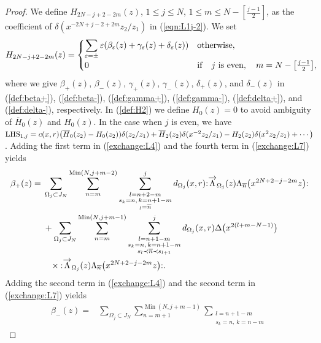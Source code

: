 \documentclass[10pt,a4paper]{amsart}
\numberwithin{equation}{section}
\begin{document}
\begin{proof}
{\sloppy We define ${H}_{2N-j+2-2m}(z)$, $1\leq j \leq N$, $1\leq m \leq N-[\frac{j-1}{2}]$,
as the coefficient of $\delta(x^{-2N+j-2+2m}z_2/z_1)$ in (\ref{eqn:L1j-2}). We set
\begin{gather}
{H}_{2N-j+2-2m}(z)=\begin{cases}
\displaystyle \sum_{\varepsilon=\pm}
\varepsilon ({\beta}_\varepsilon(z)+{\gamma}_\varepsilon(z)+{\delta}_\varepsilon(z))
& {\rm otherwise},
\\
0&{\rm {if}}\quad j~{\rm {is}~even},\quad m=N-\big[\frac{j-1}{2}\big],
\end{cases}\!\!\!\label{def:H2}
\end{gather}}%
where we give
${\beta}_+(z)$, ${\beta}_-(z)$, ${\gamma}_+(z)$,
${\gamma}_-(z)$, ${\delta}_+(z)$, and ${\delta}_-(z)$
in (\ref{def:beta+}), (\ref{def:beta-}), (\ref{def:gamma+}), (\ref{def:gamma-}),
(\ref{def:delta+}), and (\ref{def:delta-}), respectively.
In (\ref{def:H2}) we define $H_0(z)=0$ to avoid ambiguity of
$\overline{H}_0(z)$ and $H_0(z)$. In the case when $j$ is even, we have
${\rm LHS}_{1,j}=c(x,r)\big(\overline{H}_0(z_2)-H_0(z_2))\delta(z_2/z_1)
+\overline{H}_2(z_2)\delta(x^{-2}z_2/z_1)-H_2(z_2)\delta(x^2z_2/z_1)+\cdots\big)$.
Adding the first term in (\ref{exchange:L4}) and the fourth term
in (\ref{exchange:L7}) yields
\begin{align}
\beta_+(z)={}&\sum_{\Omega_j \subset J_N}
\sum_{n=m}^{\operatorname{Min}(N, j+m-2)}
\sum\limits_{\substack{l=n+2-m\\s_k=n,\, k=n+1-m
\\{_l=\overline{n}}}}^{j}d_{\Omega_j}(x,r)
{:}\overrightarrow{\Lambda}_{\Omega_j}(z)
\Lambda_{\overline{n}}\big(x^{2N+2-j-2m}z\big){:}\notag
\\
&+\sum_{\Omega_j \subset J_N}\sum_{n=m}^{\operatorname{Min}(N, j+m-1)}
\sum\limits_{\substack{l=n+1-m\\s_k=n, \, k=n+1-m\\
s_l \prec \overline{n} \prec s_{l+1}}}^{j}d_{\Omega_j}(x,r)
\Delta\big(x^{2(l+m-N-1)}\big)\notag
\\
&\phantom{+}\times{:}\overrightarrow{\Lambda}_{\Omega_j}(z)
\Lambda_{\overline{n}}\big(x^{2N+2-j-2m}z\big){:}.
\label{def:beta+}
\end{align}
Adding the second term in (\ref{exchange:L4}) and the second term in
(\ref{exchange:L7}) yields
\begin{align}
{\beta}_-(z)={}&\sum_{\Omega_j \subset J_N}\sum_{n=m+1}^{\operatorname{Min}(N, j+m-1)}
\sum\limits_{\substack{l=n+1-m\\s_k=n,\, k=n-m
}}
\end{align}
\end{proof}
\end{document}
